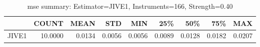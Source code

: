 \begin{table}[ht]
\centering
\caption{mse summary: Estimator=JIVE1, Instruments=166, Strength=0.40}
\begin{tabular}{lrrrrrrrr}
\toprule
 & COUNT & MEAN & STD & MIN & 25\% & 50\% & 75\% & MAX \\
\midrule
JIVE1 & 10.0000 & 0.0134 & 0.0056 & 0.0056 & 0.0089 & 0.0128 & 0.0182 & 0.0207 \\
\bottomrule
\end{tabular}
\end{table}
